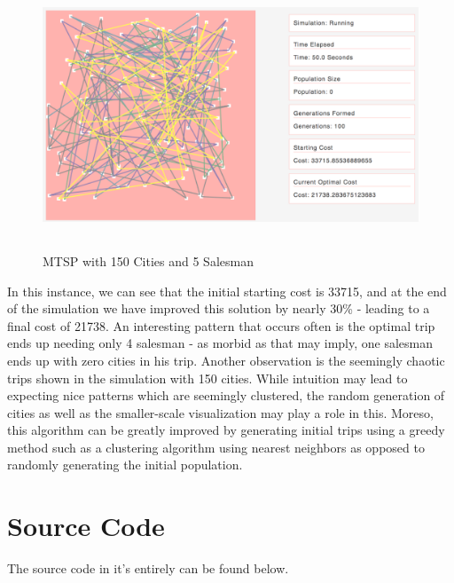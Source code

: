 \documentclass{article}
\begin{document}
\begin{figure}[h]
\centering
\includegraphics[width=16cm, height=8cm]{150Simulation}
\caption{MTSP with 150 Cities and 5 Salesman}
\end{figure}

In this instance, we can see that the initial starting cost is 33715, and at the end of the simulation we have improved this solution by nearly 30\% - leading to a final cost of 21738. An interesting pattern that occurs often is the optimal trip ends up needing only 4 salesman - as morbid as that may imply, one salesman ends up with zero cities in his trip. Another observation is the seemingly chaotic trips shown in the simulation with 150 cities. While intuition may lead to expecting nice patterns which are seemingly clustered, the random generation of cities as well as the smaller-scale visualization may play a role in this. Moreso, this algorithm can be greatly improved by generating initial trips using a greedy method such as a clustering algorithm using nearest neighbors as opposed to randomly generating the initial population.

\section{Source Code}

The source code in it's entirely can be found below.
\end{document}
